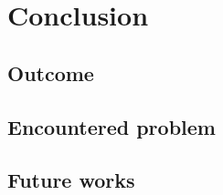 \chapter{Conclusion}
\label{ch:conclusion}

\section{Outcome}

\section{Encountered problem}

\section{Future works}
